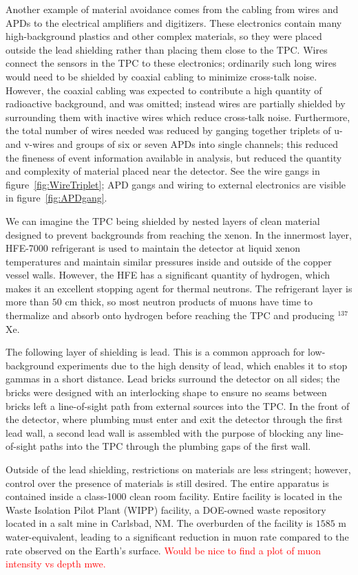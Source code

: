 Another example of material avoidance comes from the cabling from wires and APDs to the electrical amplifiers and digitizers.  These electronics contain many high-background plastics and other complex materials, so they were placed outside the lead shielding rather than placing them close to the TPC.  Wires connect the sensors in the TPC to these electronics; ordinarily such long wires would need to be shielded by coaxial cabling to minimize cross-talk noise.  However, the coaxial cabling was expected to contribute a high quantity of radioactive background, and was omitted; instead wires are partially shielded by surrounding them with inactive wires which reduce cross-talk noise.  Furthermore, the total number of wires needed was reduced by ganging together triplets of u- and v-wires and groups of six or seven APDs into single channels; this reduced the fineness of event information available in analysis, but reduced the quantity and complexity of material placed near the detector.  See the wire gangs in figure~\ref{fig:WireTriplet}; APD gangs and wiring to external electronics are visible in figure~\ref{fig:APDgang}.~\cite{detectorPartI}

We can imagine the TPC being shielded by nested layers of clean material designed to prevent backgrounds from reaching the xenon.  In the innermost layer, HFE-7000 refrigerant is used to maintain the detector at liquid xenon temperatures and maintain similar pressures inside and outside of the copper vessel walls.  However, the HFE has a significant quantity of hydrogen, which makes it an excellent stopping agent for thermal neutrons.  The refrigerant layer is more than $50$ cm thick, so most neutron products of muons have time to thermalize and absorb onto hydrogen before reaching the TPC and producing $^{137}$Xe.~\cite{detectorPartI}

The following layer of shielding is lead.  This is a common approach for low-background experiments due to the high density of lead, which enables it to stop gammas in a short distance.  Lead bricks surround the detector on all sides; the bricks were designed with an interlocking shape to ensure no seams between bricks left a line-of-sight path from external sources into the TPC.  In the front of the detector, where plumbing must enter and exit the detector through the first lead wall, a second lead wall is assembled with the purpose of blocking any line-of-sight paths into the TPC through the plumbing gaps of the first wall.~\cite{detectorPartI}

Outside of the lead shielding, restrictions on materials are less stringent; however, control over the presence of materials is still desired.  The entire apparatus is contained inside a class-1000 clean room facility.  Entire facility is located in the Waste Isolation Pilot Plant (WIPP) facility, a DOE-owned waste repository located in a salt mine in Carlsbad, NM.  The overburden of the facility is $1585$ m water-equivalent, leading to a significant reduction in muon rate compared to the rate observed on the Earth's surface.  \textcolor{red}{Would be nice to find a plot of muon intensity vs depth mwe.}

